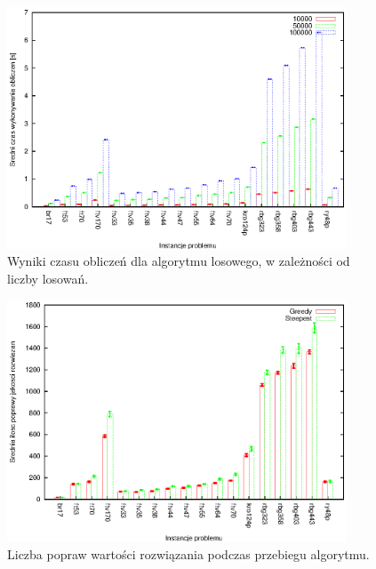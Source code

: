 \begin{figure}
\begin{center}
\includegraphics[width=0.9\textwidth]{wykresy/random2}
\end{center}
\caption{Wyniki czasu obliczeń dla algorytmu losowego, w zależności
od liczby losowań.}
\label{random2}
\end{figure}


\begin{figure}
\begin{center}
\includegraphics[width=0.9\textwidth]{wykresy/steepest_greedy_better_solutions}
\end{center}
\caption{Liczba popraw wartości rozwiązania podczas przebiegu algorytmu.}
\label{steepest_greedy_better_solutions}
\end{figure}


